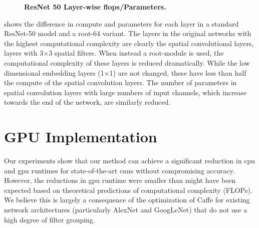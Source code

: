 \documentclass[thesis]{subfiles}
\begin{document}
{\begin{landscape}
\begin{figure}[tbp]
\begin{subfigure}[b]{0.97\linewidth}
			\datatable
			\datatablea
			
		\end{subfigure}
		\caption[ResNet 50 layer-wise \gls{flops}/parameters]{\textbf{ResNet 50 Layer-wise \gls{flops}/Parameters.} 
		}
		
		\label{fig:resnet50layerwisema}
	\end{figure}
	\end{landscape}
	}
	 shows the difference in compute and parameters for each layer in a standard ResNet-50 model and a root-64 variant. The layers in the original networks with the highest computational complexity are clearly the spatial convolutional layers, \ie layers with 3$\times$3 spatial filters. When instead a root-module is used, the computational complexity of these layers is reduced dramatically. While the low dimensional embedding layers (1$\times$1) are not changed, these have less than half the compute of the spatial convolution layers. The number of parameters in spatial convolution layers with large numbers of input channels, which increase towards the end of the network, are similarly reduced.
	
	\section{GPU Implementation}\label{gpuexplanation}
	Our experiments show that our method can achieve a significant reduction in \gls{cpu} and \gls{gpu} runtimes for state-of-the-art \glspl{cnn} without compromising accuracy. However, the reductions in \gls{gpu} runtime were smaller than might have been expected based on theoretical predictions of computational complexity (FLOPs). We believe this is largely a consequence of the optimization of Caffe for existing network architectures (particularly AlexNet and GoogLeNet) that do not use a high degree of filter grouping.
	
\end{document}
